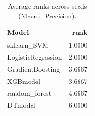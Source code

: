 \begin{table}[t]
\centering
\begin{tabular}{lr}
\toprule
Model & rank \\
\midrule
sklearn_SVM & 1.0000 \\
LogisticRegression & 2.0000 \\
GradientBoosting & 3.6667 \\
XGBmodel & 3.6667 \\
random_forest & 4.6667 \\
DTmodel & 6.0000 \\
\bottomrule
\end{tabular}
\caption{Average ranks across seeds (Macro_Precision).}
\label{tab:avg_rank_Macro_Precision}
\end{table}